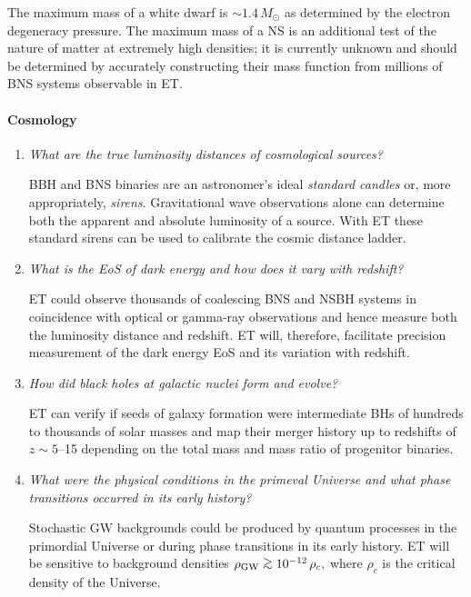 \begin{enumerate}
The maximum mass of a white dwarf is $\sim 1.4\,M_\odot$ as determined 
by the electron degeneracy pressure.  The maximum mass of a NS is an 
additional test of the nature of matter at extremely high densities; 
it is currently unknown and should be determined by accurately
constructing their mass function from millions of BNS systems observable
in ET.

\end{enumerate}
\paragraph {\bf Cosmology}
\begin{enumerate}
\item {\em What are the true luminosity distances of cosmological sources?}

BBH and BNS binaries are an astronomer's ideal {\em standard candles}
or, more appropriately, {\em sirens}.
Gravi\-tational wave observations alone can determine both the 
apparent and absolute luminosity of a source. With ET these standard sirens can
be used to calibrate the cosmic distance ladder.



\item {\em What is the EoS of dark energy and how does it vary with redshift?}

ET could observe thousands of coalescing BNS and NSBH
systems in coincidence with optical or gamma-ray observations
and hence measure both the luminosity distance and 
redshift. ET will, therefore, facilitate precision 
measurement of the dark energy EoS and its variation with redshift.

\item {\em How did black holes at galactic nuclei form and evolve?}

ET can verify if seeds of galaxy formation were intermediate BHs
of hundreds to thousands of solar masses and map their merger history up to
redshifts of $z\sim 5$--15 depending on the total mass and mass ratio of 
progenitor binaries.

\item {\em What were the physical conditions in the primeval Universe and what
phase transitions occurred in its early history?}

Stochastic GW backgrounds could be produced by quantum 
processes in the primordial Universe or during phase transitions in its 
early history. ET will be sensitive to background densities $\rho_{\rm GW}
\gsim 10^{-12}\,\rho_c,$ where $\rho_c$ is the critical density of the Universe.

\end{enumerate}

